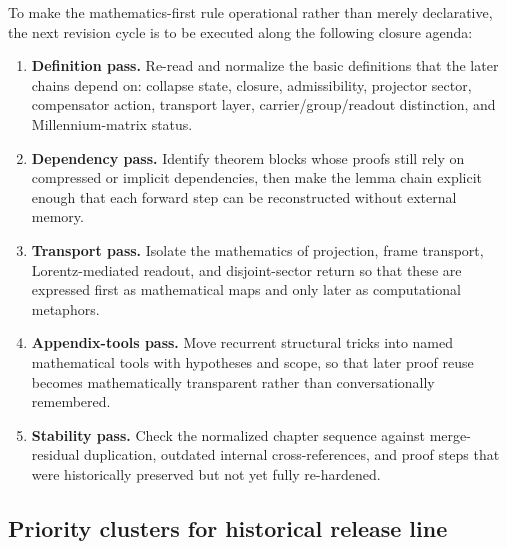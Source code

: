 \documentclass[12pt,a4paper]{article}
\DeclareRobustCommand{\QSCver}[1]{archival stage}
\renewcommand{\QSCver}[1]{historical release line}
\begin{document}
To make the mathematics-first rule operational rather than merely declarative, the next revision cycle is to be executed along the following closure agenda:
\begin{enumerate}[leftmargin=2em,label=\textbf{MA\arabic*:}]
 \item \textbf{Definition pass.} Re-read and normalize the basic definitions that the later chains depend on: collapse state, closure, admissibility, projector sector, compensator action, transport layer, carrier/group/readout distinction, and Millennium-matrix status.
 \item \textbf{Dependency pass.} Identify theorem blocks whose proofs still rely on compressed or implicit dependencies, then make the lemma chain explicit enough that each forward step can be reconstructed without external memory.
 \item \textbf{Transport pass.} Isolate the mathematics of projection, frame transport, Lorentz-mediated readout, and disjoint-sector return so that these are expressed first as mathematical maps and only later as computational metaphors.
 \item \textbf{Appendix-tools pass.} Move recurrent structural tricks into named mathematical tools with hypotheses and scope, so that later proof reuse becomes mathematically transparent rather than conversationally remembered.
 \item \textbf{Stability pass.} Check the normalized chapter sequence against merge-residual duplication, outdated internal cross-references, and proof steps that were historically preserved but not yet fully re-hardened.
\end{enumerate}

\subsection*{Priority clusters for \QSCver{v2.27.0}}
\end{document}
